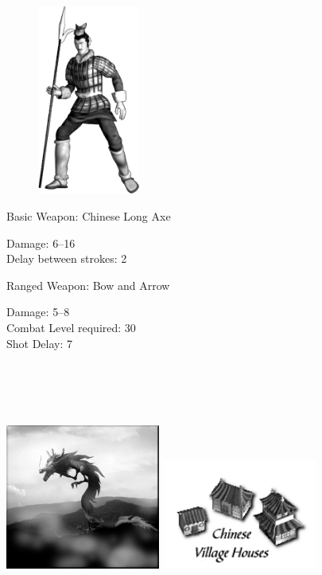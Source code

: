 \begin{figure}
	\begin{center}
		\vspace{-20pt}
		\includegraphics[width=0.3\textwidth]{Achinese}
	\end{center}
	\vspace{-20pt}
\end{figure}

Basic Weapon: Chinese Long Axe
\begin{changemargin}{.5cm}{0cm}
	Damage: 6–16 \\
	Delay between strokes: 2
\end{changemargin}
Ranged Weapon: Bow and Arrow
\begin{changemargin}{.5cm}{0cm}
	Damage: 5–8 \\
	Combat Level required: 30 \\
	Shot Delay: 7 \\ \\ \\ \\ \\
\end{changemargin}

\begin{center}
\includegraphics[width=2in]{Ajingnung} \hspace{1pt} \includegraphics[width=2in]{Ichinesehouse}
\end{center}


